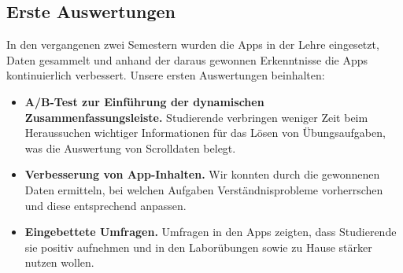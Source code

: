 \documentclass[a0,portrait]{a0poster}
\begin{document}
\begin{multicols}{2}
\section*{Erste Auswertungen}

In den vergangenen zwei Semestern wurden die Apps in der Lehre eingesetzt, Daten gesammelt und anhand der daraus gewonnen Erkenntnisse die Apps kontinuierlich verbessert. Unsere ersten Auswertungen beinhalten:

\begin{itemize}
    \item \textbf{A/B-Test zur Einführung der dynamischen Zusammenfassungsleiste.} Studierende verbringen weniger Zeit beim Heraussuchen wichtiger Informationen für das Lösen von Übungsaufgaben, was die Auswertung von Scrolldaten belegt.
    \item \textbf{Verbesserung von App-Inhalten.} Wir konnten durch die gewonnenen Daten ermitteln, bei welchen Aufgaben Verständnisprobleme vorherrschen und diese entsprechend anpassen.
    \item \textbf{Eingebettete Umfragen.} Umfragen in den Apps zeigten, dass Studierende sie positiv aufnehmen und in den Laborübungen sowie zu Hause stärker nutzen wollen.
\end{itemize}


\end{multicols}
\end{document}
